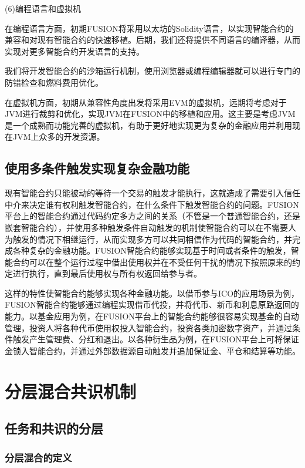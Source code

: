 \documentclass[a4paper,12pt]{article}
\begin{document}
(6)编程语言和虚拟机

在编程语言方面，初期FUSION将采用以太坊的Solidity语言，以实现智能合约的兼容和对现有智能合约的快速移植。后期，我们还将提供不同语言的编译器，从而实现对更多智能合约开发语言的支持。

我们将开发智能合约的沙箱运行机制，使用浏览器或编程编辑器就可以进行专门的防错检查和燃料费用优化。

在虚拟机方面，初期从兼容性角度出发将采用EVM的虚拟机，远期将考虑对于JVM进行裁剪和优化，实现JVM在FUSION中的移植和应用。这主要是考虑JVM是一个成熟而功能完善的虚拟机，有助于更好地实现更为复杂的金融应用并利用现在JVM上众多的开发资源。

\subsection{使用多条件触发实现复杂金融功能}

现有智能合约只能被动的等待一个交易的触发才能执行，这就造成了需要引入信任中介来决定谁有权利触发智能合约，在什么条件下触发智能合约的问题。FUSION平台上的智能合约通过代码约定多方之间的关系（不管是一个普通智能合约，还是嵌套智能合约），并使用多种触发条件自动触发的机制使智能合约可以在不需要人为触发的情况下相继运行，从而实现多方可以共同相信作为代码的智能合约，并完成各种复杂的金融功能。FUSION智能合约能够实现基于时间或者条件的触发，智能合约可以在整个运行过程中借出使用权并在不受任何干扰的情况下按照原来的约定进行执行，直到最后使用权与所有权返回给参与者。

这样的特性使智能合约能够实现各种金融功能。以借币参与ICO的应用场景为例，FUSION智能合约能够通过编程实现借币代投，并将代币、新币和利息原路返回的能力。以基金应用为例，在FUSION平台上的智能合约能够很容易实现基金的自动管理，投资人将各种代币使用权投入智能合约，投资各类加密数字资产，并通过条件触发产生管理费、分红和退出。以各种衍生品为例，在FUSION平台上可将保证金锁入智能合约，并通过外部数据源自动触发并追加保证金、平仓和结算等功能。
\section{分层混合共识机制}

\subsection{任务和共识的分层}

\subsubsection{分层混合的定义}
\end{document}
